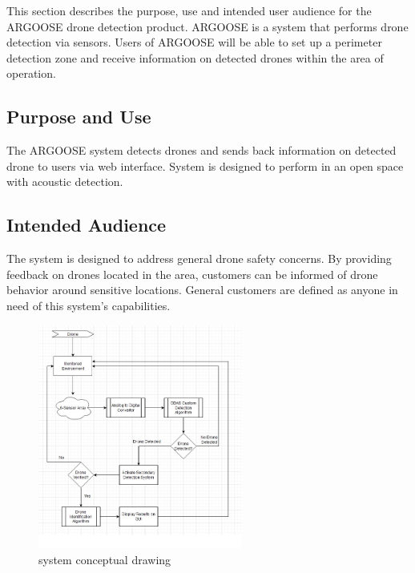 This section describes the purpose, use and intended user audience for the ARGOOSE drone detection product. ARGOOSE is a system that performs drone detection via sensors. Users of ARGOOSE will be able to set up a perimeter detection zone and receive information on detected drones within the area of operation.

\subsection{Purpose and Use}
The ARGOOSE system detects drones and sends back information on detected drone to users via web interface.  System is designed to perform in an open space with acoustic detection.

\subsection{Intended Audience}
The system is designed to address general drone safety concerns. By providing feedback on drones located in the area, customers can be informed of drone behavior around sensitive locations.  General customers are defined as anyone in need of this system's capabilities.

\begin{figure}[h!]
	\centering
   	\includegraphics[width=0.60\textwidth]{images/drone.jpg}
    \caption{system conceptual drawing}
\end{figure}
